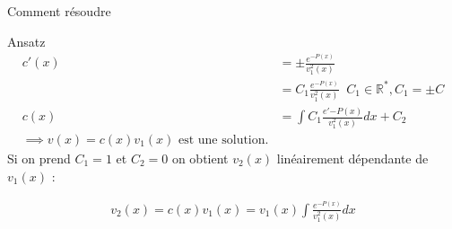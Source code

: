 \begin{parag}{Comment résoudre}
\begin{subparag}{Ansatz}
           \begin{align*}
               c'(x) &= \pm \frac{e^{-P(x)}}{v_1^2(x)} \\
                     &= C_1 \frac{e^{-P(x)}}{v_1^2(x)} \; \; C_1 \in \mathbb{R}^*, C_1 = \pm C \\ 
                   c(x) &= \int C_1 \frac{e'{-P(x)}}{v_1^2(x)}dx + C_2
                   \\
                        \implies v(x) = c(x)v_1(x) \text{ est une solution.}
           \end{align*}
           Si on prend $C_1 = 1$ et $C_2 = 0$ on obtient $v_2(x)$ linéairement dépendante de $v_1(x)$ : 
           \begin{theoreme}
               \begin{align*}
                   v_2(x) = c(x)v_1(x) = v_1(x) \int \frac{e^{-P(x)}}{v_1^2(x)} dx
               \end{align*}
           \end{theoreme}

       \end{subparag}

   \end{parag}


